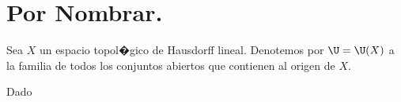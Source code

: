 \chapter{Por Nombrar.}

Sea $X$ un espacio topol�gico de Hausdorff lineal. Denotemos por $\U=\U(X)$
a la familia de todos los conjuntos abiertos que contienen al origen 
de $X$. 

Dado 